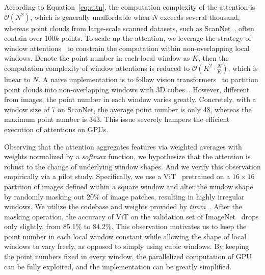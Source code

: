 \documentclass[acmtog,screen,authorversion]{acmart}
\begin{document}
According to Equation~\ref{eq:attn}, the computation complexity of the attention is $\mathcal{O}(N^2)$, which is generally unaffordable when $N$ exceeds several thousand, whereas point clouds from large-scale scanned datasets, such as ScanNet~\cite{Dai2017a}, often contain over $100k$ points.
To scale up the attention, we leverage the strategy of window attentions~\cite{Liu2021a} to constrain the computation within non-overlapping local windows.
Denote the point number in each local window as $K$, then the computation complexity of window attentions is reduced to $\mathcal{O}(K^2 \cdot \frac{N}{K})$, which is linear to $N$.
A naive implementation is to follow vision transformers~\cite{Liu2021a} to partition point clouds into non-overlapping windows with 3D cubes~\cite{Fan2022,Sun2022,Lai2022}.
However, different from images, the point number in each window varies greatly.
Concretely, with a window size of 7 on ScanNet, the average point number is only 48, whereas the maximum point number is 343.
This issue severely hampers the efficient execution of attentions on GPUs.


Observing that the attention aggregates features via weighted averages with weights normalized by a \emph{softmax} function, we hypothesize that the attention is robust to the change of underlying window shapes.
And we verify this observation empirically via a pilot study.
Specifically, we use a ViT~\cite{Dosovitskiy2021} pretrained on a $16\times16$ partition of images defined within a square window and alter the window shape by randomly masking out 20\% of image patches, resulting in highly irregular windows.  We utilize the codebase and weights provided by \emph{timm}~\cite{Wightman2019}.
After the masking operation, the accuracy of ViT on the validation set of ImageNet~\cite{Deng2009} drops only slightly, from 85.1\% to 84.2\%.
This observation motivates us to keep the point number in each local window constant while allowing the shape of local windows to vary freely, as opposed to simply using cubic windows.
By keeping the point numbers fixed in every window, the parallelized computation of GPU can be fully exploited, and the implementation can be greatly simplified.
\end{document}
